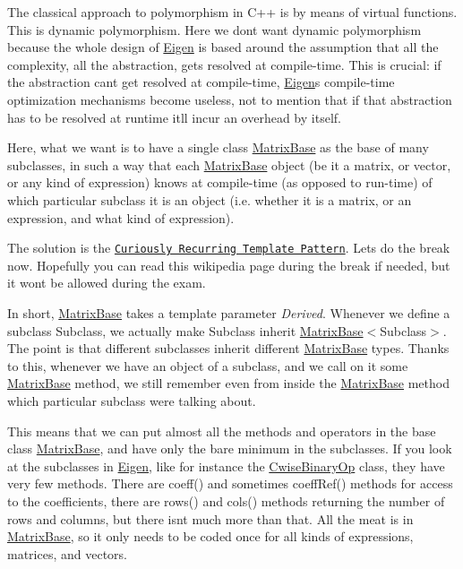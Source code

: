 The classical approach to polymorphism in C++ is by means of virtual functions. This is dynamic polymorphism. Here we don\textquotesingle{}t want dynamic polymorphism because the whole design of \hyperlink{namespace_eigen}{Eigen} is based around the assumption that all the complexity, all the abstraction, gets resolved at compile-\/time. This is crucial\+: if the abstraction can\textquotesingle{}t get resolved at compile-\/time, \hyperlink{namespace_eigen}{Eigen}\textquotesingle{}s compile-\/time optimization mechanisms become useless, not to mention that if that abstraction has to be resolved at runtime it\textquotesingle{}ll incur an overhead by itself.

Here, what we want is to have a single class \hyperlink{group___core___module_class_eigen_1_1_matrix_base}{Matrix\+Base} as the base of many subclasses, in such a way that each \hyperlink{group___core___module_class_eigen_1_1_matrix_base}{Matrix\+Base} object (be it a matrix, or vector, or any kind of expression) knows at compile-\/time (as opposed to run-\/time) of which particular subclass it is an object (i.\+e. whether it is a matrix, or an expression, and what kind of expression).

The solution is the \href{http://en.wikipedia.org/wiki/Curiously_Recurring_Template_Pattern}{\tt Curiously Recurring Template Pattern}. Let\textquotesingle{}s do the break now. Hopefully you can read this wikipedia page during the break if needed, but it won\textquotesingle{}t be allowed during the exam.

In short, \hyperlink{group___core___module_class_eigen_1_1_matrix_base}{Matrix\+Base} takes a template parameter {\itshape Derived}. Whenever we define a subclass Subclass, we actually make Subclass inherit \hyperlink{group___core___module_class_eigen_1_1_matrix_base}{Matrix\+Base}$<$Subclass$>$. The point is that different subclasses inherit different \hyperlink{group___core___module_class_eigen_1_1_matrix_base}{Matrix\+Base} types. Thanks to this, whenever we have an object of a subclass, and we call on it some \hyperlink{group___core___module_class_eigen_1_1_matrix_base}{Matrix\+Base} method, we still remember even from inside the \hyperlink{group___core___module_class_eigen_1_1_matrix_base}{Matrix\+Base} method which particular subclass we\textquotesingle{}re talking about.

This means that we can put almost all the methods and operators in the base class \hyperlink{group___core___module_class_eigen_1_1_matrix_base}{Matrix\+Base}, and have only the bare minimum in the subclasses. If you look at the subclasses in \hyperlink{namespace_eigen}{Eigen}, like for instance the \hyperlink{group___core___module_class_eigen_1_1_cwise_binary_op}{Cwise\+Binary\+Op} class, they have very few methods. There are coeff() and sometimes coeff\+Ref() methods for access to the coefficients, there are rows() and cols() methods returning the number of rows and columns, but there isn\textquotesingle{}t much more than that. All the meat is in \hyperlink{group___core___module_class_eigen_1_1_matrix_base}{Matrix\+Base}, so it only needs to be coded once for all kinds of expressions, matrices, and vectors.

